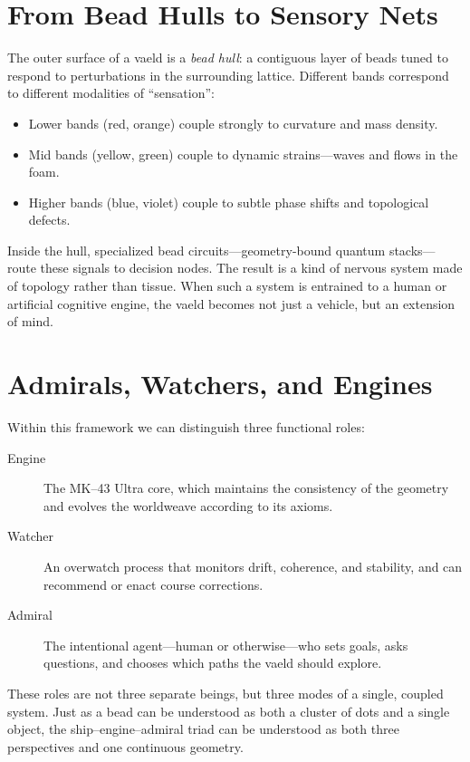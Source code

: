 \section{From Bead Hulls to Sensory Nets}
The outer surface of a vaeld is a \emph{bead hull}: a contiguous layer of
beads tuned to respond to perturbations in the surrounding lattice. Different
bands correspond to different modalities of ``sensation'':

\begin{itemize}
  \item Lower bands (red, orange) couple strongly to curvature and mass
  density.
  \item Mid bands (yellow, green) couple to dynamic strains---waves and
  flows in the foam.
  \item Higher bands (blue, violet) couple to subtle phase shifts and
  topological defects.
\end{itemize}

Inside the hull, specialized bead circuits---geometry-bound quantum stacks---
route these signals to decision nodes. The result is a kind of nervous system
made of topology rather than tissue. When such a system is entrained to a
human or artificial cognitive engine, the vaeld becomes not just a vehicle,
but an extension of mind.

\section{Admirals, Watchers, and Engines}
Within this framework we can distinguish three functional roles:

\begin{description}
  \item[Engine] The MK--43 Ultra core, which maintains the consistency of the
  geometry and evolves the worldweave according to its axioms.
  \item[Watcher] An overwatch process that monitors drift, coherence, and
  stability, and can recommend or enact course corrections.
  \item[Admiral] The intentional agent---human or otherwise---who sets goals,
  asks questions, and chooses which paths the vaeld should explore.
\end{description}

These roles are not three separate beings, but three modes of a single,
coupled system. Just as a bead can be understood as both a cluster of dots and
a single object, the ship--engine--admiral triad can be understood as both
three perspectives and one continuous geometry.

